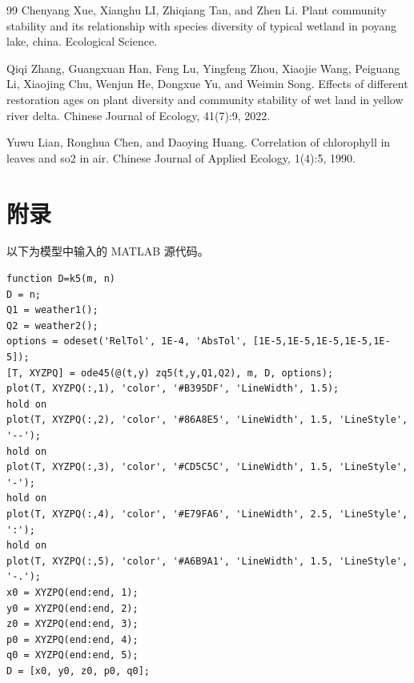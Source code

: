 \documentclass[11pt,a4paper]{ctexart}
\begin{document}
\begin{thebibliography}{99}
 Chenyang Xue, Xianghu LI, Zhiqiang Tan, and Zhen Li. Plant community stability and its relationship with species diversity of typical wetland in poyang lake, china. Ecological Science.

 Qiqi Zhang, Guangxuan Han, Feng Lu, Yingfeng Zhou, Xiaojie Wang, Peiguang Li, Xiaojing Chu, Wenjun He, Dongxue Yu, and Weimin Song. Effects of different restoration ages on plant diversity and community stability of wet land in yellow river delta. Chinese Journal of Ecology, 41(7):9, 2022.

 Yuwu Lian, Ronghua Chen, and Daoying Huang. Correlation of chlorophyll in leaves and so2 in air. Chinese Journal of Applied Ecology, 1(4):5, 1990.

\end{thebibliography}

\section{附录}

以下为模型中输入的 MATLAB 源代码。

\begin{verbatim}
function D=k5(m, n)
D = n;
Q1 = weather1();
Q2 = weather2();
options = odeset('RelTol', 1E-4, 'AbsTol', [1E-5,1E-5,1E-5,1E-5,1E-5]);
[T, XYZPQ] = ode45(@(t,y) zq5(t,y,Q1,Q2), m, D, options);
plot(T, XYZPQ(:,1), 'color', '#B395DF', 'LineWidth', 1.5);
hold on
plot(T, XYZPQ(:,2), 'color', '#86A8E5', 'LineWidth', 1.5, 'LineStyle', '--');
hold on
plot(T, XYZPQ(:,3), 'color', '#CD5C5C', 'LineWidth', 1.5, 'LineStyle', '-');
hold on
plot(T, XYZPQ(:,4), 'color', '#E79FA6', 'LineWidth', 2.5, 'LineStyle', ':');
hold on
plot(T, XYZPQ(:,5), 'color', '#A6B9A1', 'LineWidth', 1.5, 'LineStyle', '-.');
x0 = XYZPQ(end:end, 1);
y0 = XYZPQ(end:end, 2);
z0 = XYZPQ(end:end, 3);
p0 = XYZPQ(end:end, 4);
q0 = XYZPQ(end:end, 5);
D = [x0, y0, z0, p0, q0];
\end{verbatim}
\end{document}
